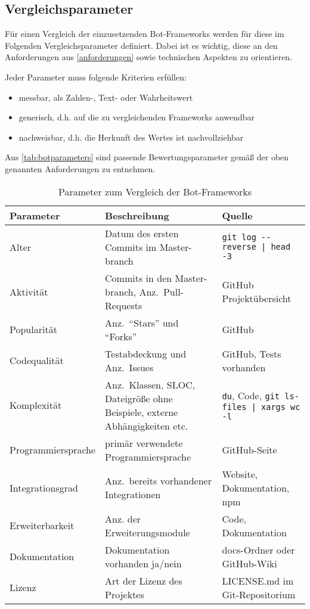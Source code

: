 
\subsection{Vergleichsparameter}
Für einen Vergleich der einzusetzenden Bot-Frameworks werden für diese im Folgenden Vergleichsparameter definiert. Dabei ist es wichtig, diese an den Anforderungen aus \autoref{anforderungen} sowie technischen Aspekten zu orientieren.

Jeder Parameter muss folgende Kriterien erfüllen:

\begin{itemize}
    \item messbar, als Zahlen-, Text- oder Wahrheitswert
    \item generisch, d.h. auf die zu vergleichenden Frameworks anwendbar
    \item nachweisbar, d.h. die Herkunft des Wertes ist nachvollziehbar
\end{itemize}

Aus \autoref{tab:botparameters} sind passende Bewertungsparameter gemäß der oben genannten Anforderungen zu entnehmen.

\begin{table}[htbp]
    \begin{tabularx}{\textwidth}{|l|X|p{6cm}|}
   \hline
   \textbf{Parameter} & \textbf{Beschreibung} & \textbf{Quelle} \\
   \hline
   Alter & Datum des ersten Commits im Master-branch & \verb+git log --reverse | head -3+\\
   \hline
   Aktivität & Commits in den Master-branch, Anz.\ Pull-Requests & GitHub Projektübersicht \\
   \hline
   Popularität & Anz.\ \enquote{Stars} und \enquote{Forks} & GitHub \\
    \hline
   Codequalität & Testabdeckung und Anz.\ Issues & GitHub, Tests vorhanden \\
   \hline
   Komplexität & Anz.\ Klassen, SLOC, Dateigröße ohne Beispiele, externe Abhängigkeiten etc. & \verb+du+, Code, \verb+git ls-files | xargs wc -l+ \\
   \hline
   Programmiersprache & primär verwendete Programmiersprache & GitHub-Seite \\
   \hline
   Integrationsgrad & Anz.\ bereits vorhandener Integrationen & Website, Dokumentation, npm \\
   \hline
   Erweiterbarkeit & Anz. der Erweiterungsmodule & Code, Dokumentation \\
   \hline
   Dokumentation & Dokumentation vorhanden ja/nein & docs-Ordner oder GitHub-Wiki \\
   \hline
   Lizenz & Art der Lizenz des Projektes & LICENSE.md im Git-Repositorium \\
   \hline
\end{tabularx}
\caption{Parameter zum Vergleich der Bot-Frameworks}
\label{tab:botparameters}
\end{table}

